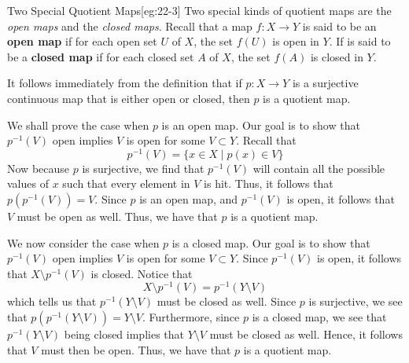 \begin{egBox}{Two Special Quotient Maps}[eg:22-3]
    Two special kinds of quotient maps are the \textit{open maps} and the 
    \textit{closed maps}.
    Recall that a map \( f: X \rightarrow Y \) is said to be an \textbf{open
    map} if for each open set \( U \) of \( X \), the set \( f ( U ) \) is open
    in \( Y \).
    If is said to be a \textbf{closed map} if for each closed set \( A \) of 
    \( X \), the set \( f ( A ) \) is closed in \( Y \).

    \baseSkip

    It follows immediately from the definition that if \( p: X \rightarrow Y \)
    is a surjective continuous map that is either open or closed, then \( p \) 
    is a quotient map.

    \baseSkip

    We shall prove the case when \( p \) is an open map.
    Our goal is to show that \( p^{ -1 } ( V ) \) open implies \( V \) is open
    for some \( V \subset Y \).
    Recall that 
    \begin{equation*}
        p^{ -1 } ( V )
        =
        \{ x \in X \mid p ( x ) \in V \}
    \end{equation*}
    Now because \( p \) is surjective, we find that \( p^{ -1 } ( V ) \) will
    contain all the possible values of \( x \) such that every element in 
    \( V \) is hit.
    Thus, it follows that \( p ( p^{ -1 } ( V ) ) = V \).
    Since \( p \) is an open map, and \( p^{ -1 } ( V ) \) is open, it follows
    that \( V \) must be open as well.
    Thus, we have that \( p \) is a quotient map.

    \baseSkip

    We now consider the case when \( p \) is a closed map.
    Our goal is to show that \( p^{ -1 } ( V ) \) open implies \( V \) is open
    for some \( V \subset Y \).
    Since \( p^{ -1 } ( V ) \) is open, it follows that 
    \( X \setminus p^{ -1 } ( V ) \) is closed.
    Notice that 
    \begin{equation*}
        X \setminus p^{ -1 } ( V )
        =
        p^{ -1 } ( Y \setminus V )
    \end{equation*}
    which tells us that \( p^{ -1 } ( Y \setminus V ) \) must be closed as 
    well.
    Since \( p \) is surjective, we see that 
    \( p ( p^{ -1 } ( Y \setminus V ) ) = Y \setminus V \).
    Furthermore, since \( p \) is a closed map, we see that
    \( p^{ -1 } ( Y \setminus V ) \) being closed implies that 
    \( Y \setminus V \) must be closed as well.
    Hence, it follows that \( V \) must then be open.
    Thus, we have that \( p \) is a quotient map.
\end{egBox}

